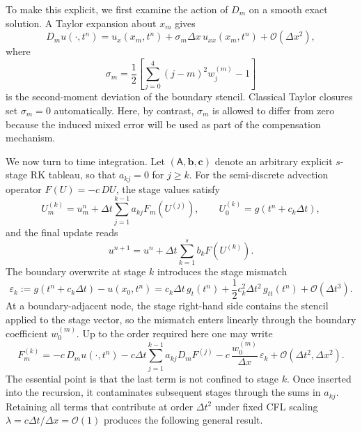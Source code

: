 \documentclass[review,hidelinks,onefignum,onetabnum]{siamart251216}
\newcommand{\Dt}{\Delta t}
\newcommand{\Dx}{\Delta x}
\newcommand{\Order}[1]{\mathcal{O}\!\left(#1\right)}
\begin{document}
To make this explicit, we first examine the action of $D_m$ on a smooth exact solution. A Taylor expansion about $x_m$ gives
\begin{equation}
  D_m u(\cdot,t^n)=u_x(x_m,t^n)+\sigma_m \Dx\,u_{xx}(x_m,t^n)+\Order{\Dx^2},
  \label{eq:stencil-action-main}
\end{equation}
where
\begin{equation}
  \sigma_m=\frac{1}{2}\left[\sum_{j=0}^{4}(j-m)^2 w_j^{(m)}-1\right]
  \label{eq:sigmam}
\end{equation}
is the second-moment deviation of the boundary stencil. Classical Taylor closures set $\sigma_m=0$ automatically. Here, by contrast, $\sigma_m$ is allowed to differ from zero because the induced mixed error will be used as part of the compensation mechanism.

We now turn to time integration. Let $(\mathsf A,\mathbf b,\mathbf c)$ denote an arbitrary explicit $s$-stage RK tableau, so that $a_{kj}=0$ for $j\ge k$. For the semi-discrete advection operator $F(U)=-c\,DU$, the stage values satisfy
\begin{equation}
  U^{(k)}_m=u^n_m+\Dt\sum_{j=1}^{k-1} a_{kj}F_m(U^{(j)}), \qquad U_0^{(k)}=g(t^n+c_k\Dt),
  \label{eq:rk-stage-gen}
\end{equation}
and the final update reads
\begin{equation}
  u^{n+1}=u^n+\Dt\sum_{k=1}^{s} b_k F(U^{(k)}).
  \label{eq:rk-update-gen}
\end{equation}
The boundary overwrite at stage $k$ introduces the stage mismatch
\begin{equation}
  \varepsilon_k:=g(t^n+c_k\Dt)-u(x_0,t^n)
  = c_k\Dt\,g_t(t^n)+\frac{1}{2}c_k^2\Dt^2\,g_{tt}(t^n)+\Order{\Dt^3}.
  \label{eq:stage-mismatch}
\end{equation}
At a boundary-adjacent node, the stage right-hand side contains the stencil applied to the stage vector, so the mismatch enters linearly through the boundary coefficient $w_0^{(m)}$. Up to the order required here one may write
\begin{equation}
  F_m^{(k)}
  = -c\,D_m u(\cdot,t^n)
    - c\Dt \sum_{j=1}^{k-1} a_{kj}D_m F^{(j)}
    - c\,\frac{w_0^{(m)}}{\Dx}\,\varepsilon_k
    + \Order{\Dt^2,\Dx^2}.
  \label{eq:stage-eval-structure}
\end{equation}
The essential point is that the last term is not confined to stage $k$. Once inserted into the recursion, it contaminates subsequent stages through the sums in $a_{kj}$. Retaining all terms that contribute at order $\Dt^2$ under fixed CFL scaling $\lambda=c\Dt/\Dx=\Order{1}$ produces the following general result.
\end{document}
